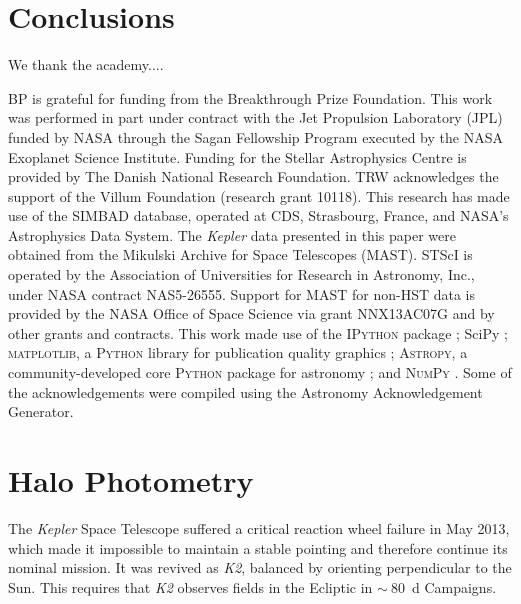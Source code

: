 \documentclass[modern]{aastex61}
\newcommand{\kepler}{\emph{Kepler}\xspace}
\newcommand{\ktwo}{\emph{K2}\xspace}
\begin{document}
\section{Conclusions}

\acknowledgments

We thank the academy....

BP is grateful for funding from the Breakthrough Prize Foundation. This work was performed in part under contract with the Jet Propulsion Laboratory (JPL) funded by NASA through the Sagan Fellowship Program executed by the NASA Exoplanet Science Institute.
Funding for the Stellar Astrophysics Centre is provided by The Danish National Research Foundation. TRW acknowledges the support of the Villum Foundation (research grant 10118).
This research has made use of the SIMBAD database, operated at CDS, Strasbourg, France, and NASA's Astrophysics Data System. The \kepler data presented in this paper were obtained from the Mikulski Archive for Space Telescopes (MAST). STScI is operated by the Association of Universities for Research in Astronomy, Inc., under NASA contract NAS5-26555. Support for MAST for non-HST data is provided by the NASA Office of Space Science via grant NNX13AC07G and by other grants and contracts.  This work made use of the \textsc{IPython} package \citep{PER-GRA:2007}; SciPy \citep{scipy};  \textsc{matplotlib}, a \textsc{Python} library for publication quality graphics \citep{Hunter:2007}; \textsc{Astropy}, a community-developed core \textsc{Python} package for astronomy \citep{2013A&A...558A..33A}; and \textsc{NumPy} \citep{van2011numpy}. Some of the acknowledgements were compiled using the Astronomy Acknowledgement Generator.

\appendix

\section{Halo Photometry}
\label{halo}

The \kepler Space Telescope \citep{2010sci...327..977b}  
suffered a critical reaction wheel failure in May 2013, which made it impossible to maintain a stable pointing and therefore continue its nominal mission. It was revived as \ktwo \citep{howell14}, balanced by orienting perpendicular to the Sun. This requires that \ktwo observes fields in the Ecliptic in $\sim~80$~d Campaigns. 
\end{document}
